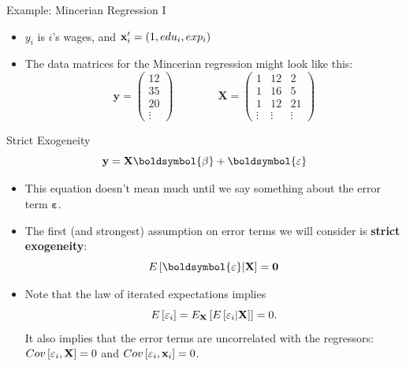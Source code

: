 \documentclass[aspectratio=169,11pt]{beamer}
\begin{document}
\begin{frame}{Example: Mincerian Regression I}
\begin{itemize}
	\item $y_{i}$ is $i$'s wages, and ${\bf x}_i' = \left(1,edu_i,exp_i \right)$

	\medskip
	\item The data matrices for the Mincerian regression might look like this:
\[
\boldsymbol{y}=\left(\begin{array}{c}
12\\
35\\
20\\
\vdots
\end{array}\right)\qquad\qquad\boldsymbol{X}=\left(\begin{array}{ccc}
1 & 12 & 2\\
1 & 16 & 5\\
1 & 12 & 21\\
\vdots & \vdots & \vdots
\end{array}\right)
\]
\end{itemize}
\end{frame}

\begin{frame}{Strict Exogeneity}
	\begin{equation*}
		{\bf y}= {\bf X} \boldsymbol{\beta} + \boldsymbol{\varepsilon}
	\end{equation*}
\begin{itemize}
	\item This equation doesn't mean much until we say something about the error term $\boldsymbol{\varepsilon}$.

	\item The first (and strongest) assumption on error terms we will consider is {\bf strict exogeneity}:\[
		E\left[\boldsymbol{\varepsilon} | {\bf X} \right] = {\bf 0}
	\]

	\item Note that the law of iterated expectations implies\[
		E\left[\varepsilon_i\right] = E_{{\bf X}} \left[E\left[\varepsilon_i | {\bf X}\right] \right] = 0.
	\]
	It also implies that the error terms are uncorrelated with the regressors: $Cov\left[\varepsilon_{i},{\bf X}\right]=0$ 
	and $Cov\left[\varepsilon_{i}, {\bf x}_{i}\right]=0$.
\end{itemize}
\end{frame}
\end{document}

